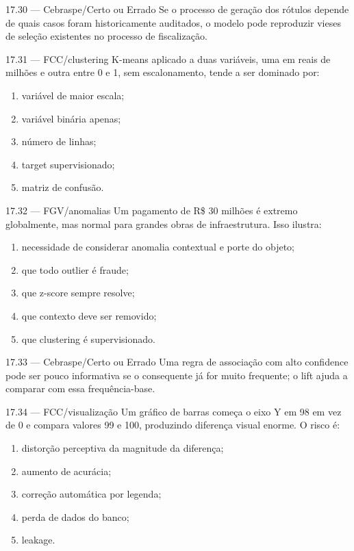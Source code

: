 \begin{questao}{ 17.30 — Cebraspe/Certo ou Errado}
Se o processo de geração dos rótulos depende de quais casos foram historicamente auditados, o modelo pode reproduzir vieses de seleção existentes no processo de fiscalização.
\end{questao}

\begin{questao}{ 17.31 — FCC/clustering}
K-means aplicado a duas variáveis, uma em reais de milhões e outra entre 0 e 1, sem escalonamento, tende a ser dominado por:
\begin{enumerate}[label=\Alph*)]
\item variável de maior escala;
\item variável binária apenas;
\item número de linhas;
\item target supervisionado;
\item matriz de confusão.
\end{enumerate}
\end{questao}

\begin{questao}{ 17.32 — FGV/anomalias}
Um pagamento de R\$ 30 milhões é extremo globalmente, mas normal para grandes obras de infraestrutura. Isso ilustra:
\begin{enumerate}[label=\Alph*)]
\item necessidade de considerar anomalia contextual e porte do objeto;
\item que todo outlier é fraude;
\item que z-score sempre resolve;
\item que contexto deve ser removido;
\item que clustering é supervisionado.
\end{enumerate}
\end{questao}

\begin{questao}{ 17.33 — Cebraspe/Certo ou Errado}
Uma regra de associação com alto confidence pode ser pouco informativa se o consequente já for muito frequente; o lift ajuda a comparar com essa frequência-base.
\end{questao}

\begin{questao}{ 17.34 — FCC/visualização}
Um gráfico de barras começa o eixo Y em 98 em vez de 0 e compara valores 99 e 100, produzindo diferença visual enorme. O risco é:
\begin{enumerate}[label=\Alph*)]
\item distorção perceptiva da magnitude da diferença;
\item aumento de acurácia;
\item correção automática por legenda;
\item perda de dados do banco;
\item leakage.
\end{enumerate}
\end{questao}

